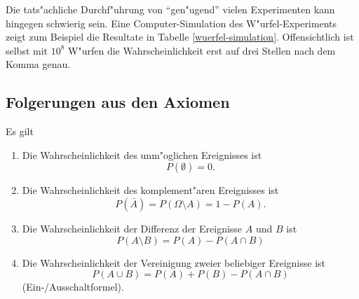 Die tats"achliche Durchf"uhrung von ``gen"ugend'' vielen Experimenten
kann hingegen schwierig sein. Eine Computer-Simulation des
W"urfel-Experiments zeigt zum Beispiel die Resultate in Tabelle
\ref{wuerfel-simulation}. Offensichtlich ist selbst mit $10^8$
W"urfen die Wahrscheinlichkeit erst auf drei Stellen nach dem Komma
genau.

\subsection{Folgerungen aus den Axiomen}
\begin{satz}Es gilt
\begin{enumerate}
\item Die Wahrscheinlichkeit des unm"oglichen Ereignisses ist
\begin{equation}
P(\emptyset) = 0.
\label{p-emptyset}
\end{equation}
\item Die Wahrscheinlichkeit des komplement"aren Ereignisses
ist
\begin{equation}
P(\bar A) = P(\Omega\setminus A) = 1 -P(A).
\label{p-negation}
\end{equation}
\item Die Wahrscheinlichkeit der Differenz der Ereignisse $A$ und $B$
ist
\begin{equation}
P(A\setminus B) = P(A) - P(A\cap B)
\label{p-complement} %
\end{equation}
\item Die Wahrscheinlichkeit der Vereinigung zweier beliebiger Ereignisse
ist
\begin{equation}
P(A\cup B) = P(A) + P(B) - P(A\cap B)
\label{p-union}
\end{equation}
(Ein-/Ausschaltformel).
\end{enumerate}
\end{satz}

